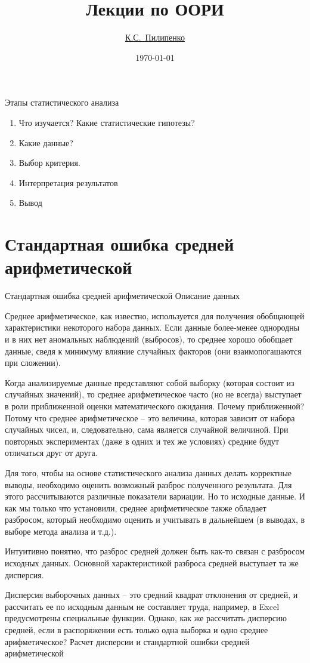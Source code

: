 \documentclass[14pt,a4paper]{article}
\title{Лекции по ООРИ}
\author{\href{mailto:www-kirill.pilipenko@yandex.ru}{К.С.~Пилипенко}} %
\date{\selectlanguage{russian}\today}
\begin{document}
\maketitle
Этапы статистического анализа
\begin{enumerate}
    \item Что изучается? Какие статистические гипотезы?
    \item Какие данные?
    \item Выбор критерия.
    \item Интерпретация результатов
    \item Вывод
\end{enumerate}

\section{Стандартная ошибка средней арифметической}
Стандартная ошибка средней арифметической
Описание данных

Среднее арифметическое, как известно, используется для получения обобщающей характеристики некоторого набора данных. Если данные более-менее однородны и в них нет аномальных наблюдений (выбросов), то среднее хорошо обобщает данные, сведя к минимуму влияние случайных факторов (они взаимопогашаются при сложении).

Когда анализируемые данные представляют собой выборку (которая состоит из случайных значений), то среднее арифметическое часто (но не всегда) выступает в роли приближенной оценки математического ожидания. Почему приближенной? Потому что среднее арифметическое – это величина, которая зависит от набора случайных чисел, и, следовательно, сама является случайной величиной. При повторных экспериментах (даже в одних и тех же условиях) средние будут отличаться друг от друга.

Для того, чтобы на основе статистического анализа данных делать корректные выводы, необходимо оценить возможный разброс полученного результата. Для этого рассчитываются различные показатели вариации. Но то исходные данные. И как мы только что установили, среднее арифметическое также обладает разбросом, который необходимо оценить и учитывать в дальнейшем (в выводах, в выборе метода анализа и т.д.).

Интуитивно понятно, что разброс средней должен быть как-то связан с разбросом исходных данных. Основной характеристикой разброса средней выступает та же дисперсия.

Дисперсия выборочных данных – это средний квадрат отклонения от средней, и рассчитать ее по исходным данным не составляет труда, например, в Excel предусмотрены специальные функции. Однако, как же рассчитать дисперсию средней, если в распоряжении есть только одна выборка и одно среднее арифметическое?
Расчет дисперсии и стандартной ошибки средней арифметической
\end{document}
